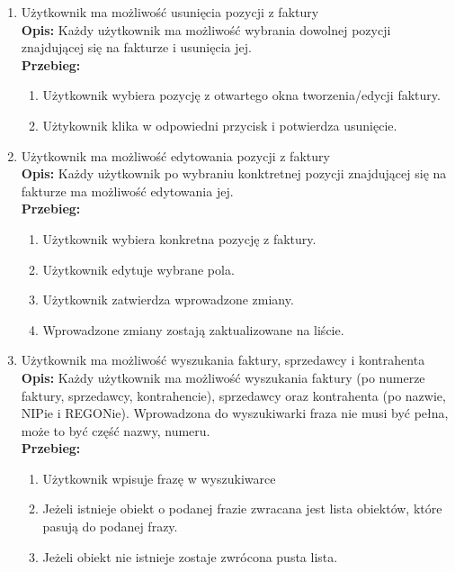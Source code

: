 \begin{enumerate}
    \item Użytkownik ma możliwość usunięcia pozycji z faktury\\
    \textbf{Opis: } Każdy użytkownik ma możliwość wybrania dowolnej pozycji znajdującej się na fakturze i usunięcia jej.\\
    \textbf{Przebieg: } 
    \begin{enumerate}
        \item Użytkownik wybiera pozycję z otwartego okna tworzenia/edycji faktury. 
        \item Użtykownik klika w odpowiedni przycisk i potwierdza usunięcie. \\
    \end{enumerate}
    
    \item Użytkownik ma możliwość edytowania pozycji z faktury\\
    \textbf{Opis: } Każdy użytkownik po wybraniu konktretnej pozycji znajdującej się na fakturze ma możliwość edytowania jej.\\
    \textbf{Przebieg: }
    \begin{enumerate}
        \item Użytkownik wybiera konkretna pozycję z faktury.
        \item Użytkownik edytuje wybrane pola.
        \item Użytkownik zatwierdza wprowadzone zmiany.
        \item Wprowadzone zmiany zostają zaktualizowane na liście.\\
    \end{enumerate}
    
    \item Użytkownik ma możliwość wyszukania faktury, sprzedawcy i kontrahenta \\
    \textbf{Opis: } Każdy użytkownik ma możliwość wyszukania faktury (po numerze faktury, sprzedawcy, kontrahencie), sprzedawcy oraz kontrahenta (po nazwie, NIPie i REGONie). Wprowadzona do wyszukiwarki fraza nie musi być pełna, może to być część nazwy, numeru. \\
    \textbf{Przebieg: }
    \begin{enumerate}
        \item Użytkownik wpisuje frazę w wyszukiwarce
        \item Jeżeli istnieje obiekt o podanej frazie zwracana jest lista obiektów, które pasują do podanej frazy.
        \item Jeżeli obiekt nie istnieje zostaje zwrócona pusta lista.\\
    \end{enumerate}
    

\end{enumerate}
